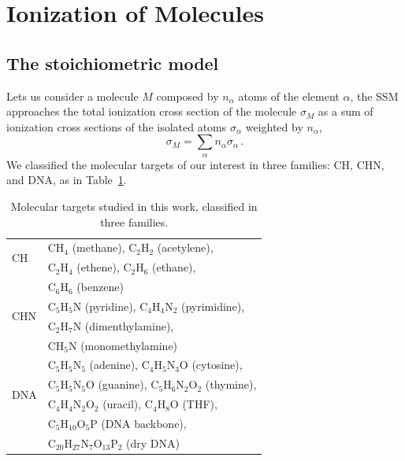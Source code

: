 \documentclass[10pt,showpacs,showkeys,twocolumn]{revtex4}
\begin{document}
\section{Ionization of Molecules}
\label{sec:molecules}
\subsection{The stoichiometric model}
\label{subsec:stoichiometric}

Lets us consider a molecule $M$ composed by $n_{\alpha}$ atoms of the
element $\alpha$, the SSM approaches the total ionization cross section 
of the molecule $\sigma_{M}$ as a sum of ionization cross sections of 
the isolated atoms $\sigma_{\alpha}$ weighted by $n_{\alpha}$, 
\begin{equation}
 \sigma_{M}=\sum\limits_{\alpha}n_{\alpha}\sigma_{\alpha}\,.  
 \label{eq:sumion}
\end{equation}
We classified the molecular targets of our interest in three families: 
CH, CHN, and DNA, as in Table~\ref{tab:families}.

\begin{table}[t]
\begin{center}
\begin{tabular}{|p{}|p{}|}
\hline
\multirow{2}{*}{CH} 
      & CH$_4$ (methane), C$_2$H$_2$ (acetylene),  \\
      & C$_2$H$_4$ (ethene), C$_2$H$_6$ (ethane), \\
      & C$_6$H$_6$ (benzene) \\
\hline
\multirow{2}{*}{CHN} 
      & C$_5$H$_5$N (pyridine), C$_4$H$_4$N$_2$ (pyrimidine), \\ 
      & C$_2$H$_7$N (dimenthylamine), \\
      & CH$_5$N (monomethylamine) \\
\hline
\multirow{4}{*}{DNA} 
      & C$_5$H$_5$N$_5$ (adenine), C$_4$H$_5$N$_3$O (cytosine), \\
      & C$_5$H$_5$N$_5$O (guanine), C$_5$H$_6$N$_2$O$_2$ (thymine), \\
      & C$_4$H$_4$N$_2$O$_2$ (uracil), C$_4$H$_8$O (THF), \\
      & C$_5$H$_{10}$O$_5$P (DNA backbone), \\
      & C$_{20}$H$_{27}$N$_7$O$_{13}$P$_2$ 
(dry DNA) \\
\hline
\end{tabular}
\caption{Molecular targets studied in this work, classified in three 
families.}
\label{tab:families}
\end{center}
\end{table}
\end{document}
